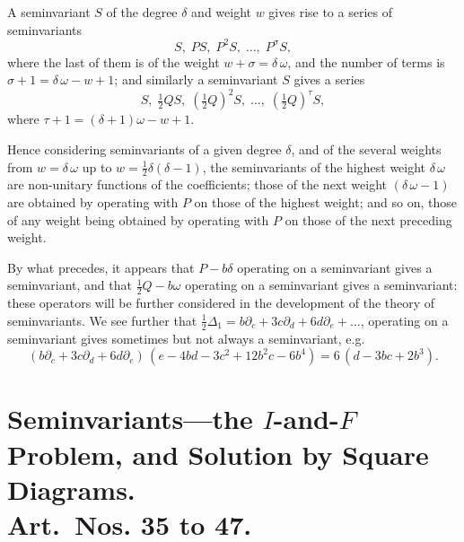 \documentclass[11pt,a4paper]{book}
\begin{document}
\setcounter{art}{33}
\begin{art}
A seminvariant $S$ of the degree $\delta$ and weight $w$ gives rise to a series of seminvariants
\[
S,\; PS,\; P^{2}S,\; \ldots,\; P^{\sigma}S,
\]
where the last of them is of the weight $w + \sigma = \delta\,\omega$, and the number of terms is $\sigma + 1 = \delta\,\omega - w + 1$; and similarly a seminvariant $S$ gives a series
\[
S,\; \tfrac{1}{2}QS,\; (\tfrac{1}{2}Q)^{2}S,\; \ldots,\; (\tfrac{1}{2}Q)^{\tau}S,
\]
where $\tau + 1 = (\delta + 1)\omega - w + 1$.

Hence considering seminvariants of a given degree $\delta$, and of the several weights from $w = \delta\,\omega$ up to $w = \frac{1}{2}\delta(\delta - 1)$, the seminvariants of the highest weight $\delta\,\omega$ are non-unitary functions of the coefficients; those of the next weight $(\delta\,\omega - 1)$ are obtained by operating with $P$ on those of the highest weight; and so on, those of any weight being obtained by operating with $P$ on those of the next preceding weight.
\end{art}

\setcounter{art}{34}
\begin{art}
By what precedes, it appears that $P - b\delta$ operating on a seminvariant gives a seminvariant, and that $\frac{1}{2}Q - b\omega$ operating on a seminvariant gives a seminvariant: these operators will be further considered in the development of the theory of seminvariants. We see further that $\frac{1}{2}\Delta_{1} = b\partial_{c} + 3c\partial_{d} + 6d\partial_{e} + \ldots$, operating on a seminvariant gives sometimes but not always a seminvariant, e.g.
\[
(b\partial_{c} + 3c\partial_{d} + 6d\partial_{e})\,(e - 4bd - 3c^{2} + 12b^{2}c - 6b^{4}) = 6\,(d - 3bc + 2b^{3}).
\]
\end{art}

\section*{Seminvariants---the $I$-and-$F$ Problem, and Solution by Square Diagrams.\\ Art.~Nos. \textbf{35} to \textbf{47}.}
\end{document}
